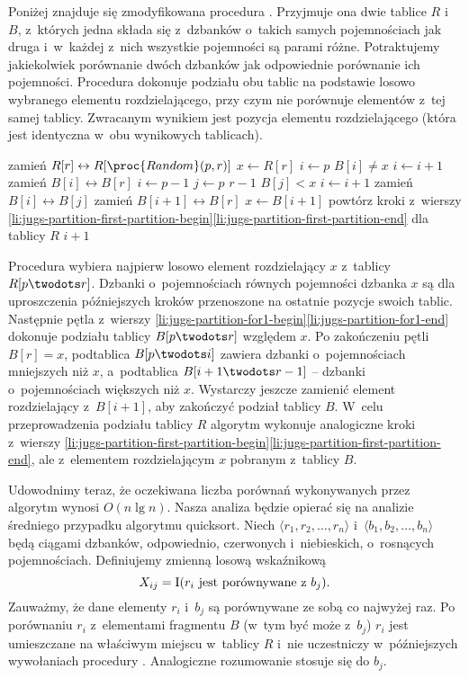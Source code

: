 Poniżej znajduje się zmodyfikowana procedura .
Przyjmuje ona dwie tablice $R$ i~$B$, z~których jedna składa się z~dzbanków o~takich samych pojemnościach jak druga i~w~każdej z~nich wszystkie pojemności są parami różne.
Potraktujemy jakiekolwiek porównanie dwóch dzbanków jak odpowiednie porównanie ich pojemności.
Procedura dokonuje podziału obu tablic na podstawie losowo wybranego elementu rozdzielającego, przy czym nie porównuje elementów z~tej samej tablicy.
Zwracanym wynikiem jest pozycja elementu rozdzielającego (która jest identyczna w~obu wynikowych tablicach).
\begin{codebox}
\li	zamień $R[r]\leftrightarrow R[\proc{Random}(p,r)]$
\li	$x\gets R[r]$
\li	$i\gets p$
\li	\While $B[i]\ne x$
\li		\Do $i\gets i+1$
		\End
\li	zamień $B[i]\leftrightarrow B[r]$
\li	$i\gets p-1$ \label{li:jugs-partition-first-partition-begin}
\li	\For $j\gets p$ \To $r-1$ \label{li:jugs-partition-for1-begin}
\li		\Do \If $B[j]<x$
\li				\Then $i\gets i+1$
\li					zamień $B[i]\leftrightarrow B[j]$
				\End
		\End \label{li:jugs-partition-for1-end}
\li	zamień $B[i+1]\leftrightarrow B[r]$ \label{li:jugs-partition-first-partition-end}
\li	$x\gets B[i+1]$
\li	powtórz kroki z~wierszy \ref{li:jugs-partition-first-partition-begin}\nbendash\ref{li:jugs-partition-first-partition-end} dla tablicy $R$ \label{li:jugs-partition-second-partition}
\li	\Return $i+1$
\end{codebox}

Procedura wybiera najpierw losowo element rozdzielający $x$ z~tablicy $R[p\twodots r]$.
Dzbanki o~pojemnościach równych pojemności dzbanka $x$ są dla uproszczenia późniejszych kroków przenoszone na ostatnie pozycje swoich tablic.
Następnie pętla  z~wierszy \ref{li:jugs-partition-for1-begin}\nbendash\ref{li:jugs-partition-for1-end} dokonuje podziału tablicy $B[p\twodots r]$ względem $x$.
Po zakończeniu pętli $B[r]=x$, podtablica $B[p\twodots i]$ zawiera dzbanki o~pojemnościach mniejszych niż $x$, a~podtablica $B[i+1\twodots r-1]$ -- dzbanki o~pojemnościach większych niż $x$.
Wystarczy jeszcze zamienić element rozdzielający z~$B[i+1]$, aby zakończyć podział tablicy $B$.
W~celu przeprowadzenia podziału tablicy $R$ algorytm wykonuje analogiczne kroki z~wierszy \ref{li:jugs-partition-first-partition-begin}\nbendash\ref{li:jugs-partition-first-partition-end}, ale z~elementem rozdzielającym $x$ pobranym z~tablicy $B$.

Udowodnimy teraz, że oczekiwana liczba porównań wykonywanych przez algorytm  wynosi $O(n\lg n)$.
Nasza analiza będzie opierać się na analizie średniego przypadku algorytmu quicksort.
Niech $\langle r_1,r_2,\dots,r_n\rangle$ i~$\langle b_1,b_2,\dots,b_n\rangle$ będą ciągami dzbanków, odpowiednio, czerwonych i~niebieskich, o~rosnących pojemnościach.
Definiujemy zmienną losową wskaźnikową
\[
    X_{ij} = \operatorname{I}(\text{$r_i$ jest porównywane z~$b_j$}).
\]
Zauważmy, że dane elementy $r_i$ i~$b_j$ są porównywane ze sobą co najwyżej raz.
Po porównaniu $r_i$ z~elementami fragmentu $B$ (w~tym być może z~$b_j$) $r_i$ jest umieszczane na właściwym miejscu w~tablicy $R$ i~nie uczestniczy w~późniejszych wywołaniach procedury .
Analogiczne rozumowanie stosuje się do $b_j$.

